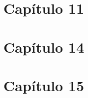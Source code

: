 \documentclass[conference]{IEEEtran}
\begin{document}
\section{Capítulo 11}

\section{Capítulo 14}
\section{Capítulo 15}









%
%
%
%
%
%    
%    
%    
\end{document}
